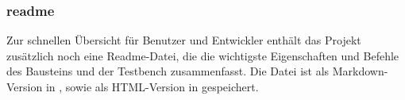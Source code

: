 \documentclass[a4paper]{article}
\begin{document}
        	\subsubsection{readme}
				Zur schnellen Übersicht für Benutzer und Entwickler enthält das Projekt zusätzlich noch eine Readme-Datei, 
				die die wichtigste Eigenschaften und Befehle des Bausteins und der Testbench zusammenfasst. 
				Die Datei ist als Markdown-Version in , sowie als HTML-Version in  gespeichert.
         
\end{document}
